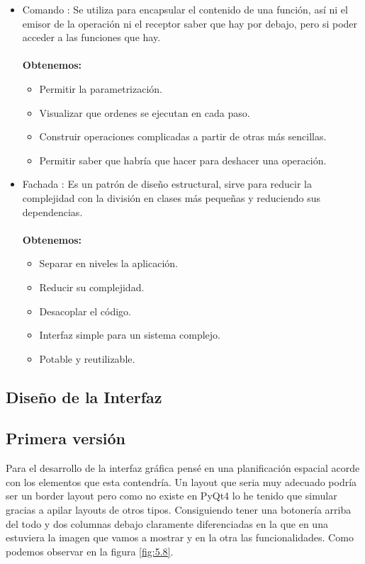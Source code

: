 \begin{itemize}
\item Comando \cite{wiki:Comando}: Se utiliza para encapsular el contenido de una función, así ni el emisor de la operación ni el receptor saber que hay por debajo, pero si poder acceder a las funciones que hay.\\\\
\textbf{Obtenemos:}
\begin{itemize}
\item Permitir la parametrización.
\item Visualizar que ordenes se ejecutan en cada paso.
\item Construir operaciones complicadas a partir de otras más sencillas.
\item Permitir saber que habría que hacer para deshacer una operación.
\end{itemize}
\item Fachada \cite{wiki:Fachada}: Es un patrón de diseño estructural, sirve para reducir la complejidad con la división en clases más pequeñas y reduciendo sus dependencias.\\\\
\textbf{Obtenemos:}
\begin{itemize}
\item Separar en niveles la aplicación.
\item Reducir su complejidad.
\item Desacoplar el código.
\item Interfaz simple para un sistema complejo.
\item Potable y reutilizable.
\end{itemize}
\end{itemize}


\subsection{Diseño de la Interfaz}

\subsection{Primera versión}

Para el desarrollo de la interfaz gráfica pensé en una planificación espacial acorde con los elementos que esta contendría.
Un layout que seria muy adecuado podría ser un border layout pero como no existe en PyQt4 lo he tenido que simular gracias a apilar layouts de otros tipos.
Consiguiendo tener una botonería arriba del todo y dos columnas debajo claramente diferenciadas en la que en una estuviera la imagen que vamos a mostrar y en la otra las funcionalidades.
Como podemos observar en la figura \ref{fig:5.8}.

